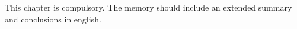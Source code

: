 This chapter is compulsory. The memory should include an extended summary and conclusions in english. 